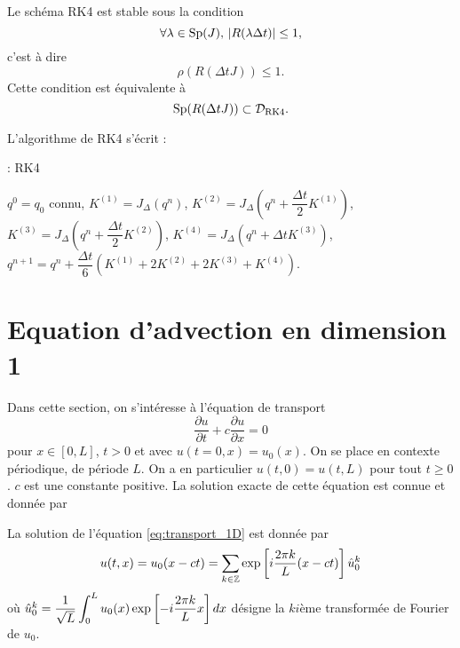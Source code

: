 \begin{proposition}
Le schéma RK4 est stable sous la condition
\begin{equation}
\forall \lambda \in \text{Sp}(J) \text{, } |R(\lambda \Delta t)| \leq 1,
\end{equation}
c'est à dire 
\begin{equation}
\rho (R(\Delta t J)) \leq 1.
\end{equation}
Cette condition est équivalente à
\begin{equation}
\Sp (R(\Delta t J)) \subset \mathcal{D}_{\RK4}.
\end{equation}
\label{prop:stab_rk4_mat}
\end{proposition}

L'algorithme de RK4 s'écrit :
\begin{center}
\begin{minipage}[H]{12cm}
  \begin{algorithm}[H]
    \caption{: RK4}\label{alg:RK4}
    \begin{algorithmic}[1]
    \State $q^0 = q_0$ connu,
             \State  $K^{(1)} = J_{\Delta} \left( q^n \right)$,
             \State  $K^{(2)} = J_{\Delta} \left( q^n + \dfrac{\Delta t}{2} K^{(1)}\right)$,
             \State  $K^{(3)} = J_{\Delta} \left( q^n + \dfrac{\Delta t}{2} K^{(2)}\right)$,
             \State  $K^{(4)} = J_{\Delta} \left( q^n + \Delta t K^{(3)}\right)$,  
             \State  $q^{n+1} = q^n  + \dfrac{\Delta t}{6} \left( K^{(1)} + 2 K^{(2)} + 2 K^{(3)} + K^{(4)} \right)$.
            \EndFor
    \end{algorithmic}
    \end{algorithm}
\end{minipage}
\end{center}




\section{Equation d'advection en dimension 1}

Dans cette section, on s'intéresse à l'équation de transport
\begin{equation}
\dfrac{\partial u}{\partial t} + c \dfrac{\partial u}{\partial x} = 0
\label{eq:transport_1D}
\end{equation}
pour $x \in [0,L]$, $t>0$ et avec $u(t=0,x)=u_0(x)$. On se place en contexte périodique, de période $L$. On a en particulier $u(t,0)=u(t,L)$ pour tout $t \geq 0$. $c$ est une constante positive. La solution exacte de cette équation est connue et donnée par 
\begin{proposition}
La solution de l'équation \eqref{eq:transport_1D} est donnée par 
\begin{equation}
u(t,x) = u_0(x-ct) = \displaystyle\sum\limits_{k \in \mathbb{Z}} \exp \left[ i \dfrac{2 \pi k}{L} (x-ct) \right] \hat{u}_0^k
\end{equation}
où $\hat{u}_0^k = \dfrac{1}{\sqrt{L}} \displaystyle\int_0^L u_0(x) \exp \left[ - i \dfrac{2 \pi k}{L}x \right] dx$ désigne la $ki$ème transformée de Fourier de $u_0$.
\end{proposition}

